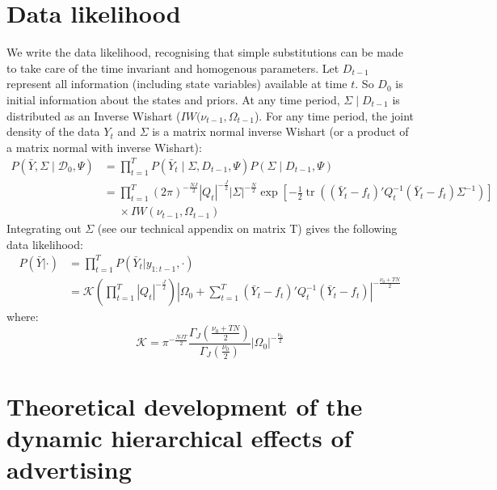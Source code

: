 \documentclass[letter,10pt]{article}
\DeclareMathOperator\tr{tr}
\begin{document}
\section*{Data likelihood}

We write the data likelihood, recognising that 
simple substitutions can be made to take care of the time invariant and homogenous parameters.
Let $D_{t-1}$ represent all information (including state variables) available at time $t$.  So $D_0$ is initial 
information about the states and priors.  
At any time period, $\Sigma \mid D_{t-1}$ is distributed as an Inverse Wishart ($IW(\nu_{t-1},\Omega_{t-1}$).
For any time period, the joint density of the data $Y_t$ and $\Sigma$ is a matrix
normal inverse Wishart (or a product of a matrix normal with inverse Wishart):
\begin{align}
P(\bar{Y},\Sigma\mid \mathcal{D}_0,\Psi)&=\prod_{t=1}^T P(\bar{Y}_t \mid \Sigma, D_{t-1},\Psi) P(\Sigma \mid D_{t-1},\Psi) \\
& = \prod_{t=1}^T   (2\pi)^{-\frac{NJ}{2}}|Q_t|^{-\frac{J}{2}}|\Sigma|^{-\frac{N}{2}}\exp\left[
  -\frac{1}{2}\tr\left(\left(
      \bar{Y}_t-f_t\right)'Q_t^{-1}\left(\bar{Y}_t-f_t\right)\Sigma^{-1}\right)\right] \nonumber\\
& ~~~~~~ \times IW(\nu_{t-1},\Omega_{t-1})
\end{align}
Integrating out $\Sigma$ (see our technical appendix on matrix T) gives the following data likelihood:
\begin{align}
  P(\bar{Y}|\cdot)&=\prod_{t=1}^TP(\bar{Y}_t|y_{1:t-1},\cdot)\nonumber\\
\label{eq:LL-T}
&= \mathcal{K} \left(\prod_{t=1}^T|Q_t|^{-\frac{J}{2}}\right)|\Omega_0+\sum_{t=1}^T\left(\bar{Y}_t-f_t\right)'Q_t^{-1}\left(\bar{Y}_t-f_t\right)|^{-\frac{\nu_0+TN}{2}}
\end{align}
where:
\[
\mathcal{K} = \pi^{-\frac{NJT}{2}}\frac{\Gamma_J\left(\frac{\nu_0+TN}{2}\right)}{\Gamma_J\left(\frac{\nu_0}{2}\right)}|\Omega_0|^{-\frac{\nu_0}{2}}
\]




\section{Theoretical development of the dynamic hierarchical effects of advertising}
\end{document}
